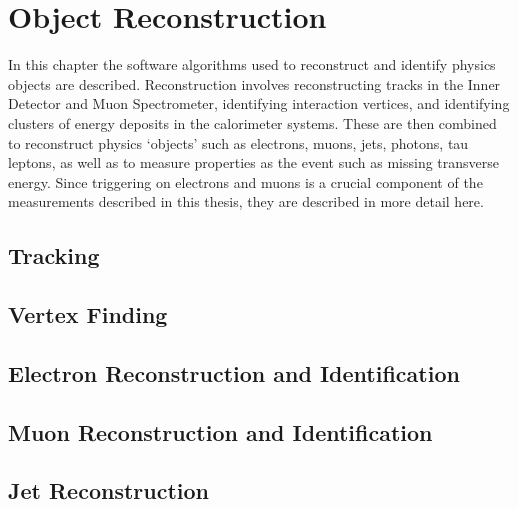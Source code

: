 \graphicspath{{Chapters/Reconstruction/Figures/}}
\label{chap:Reconstruction}
\chapter{Object Reconstruction}

In this chapter the software algorithms used to reconstruct and identify physics
objects are described. Reconstruction involves reconstructing tracks in the
Inner Detector and Muon Spectrometer, identifying interaction vertices,
and identifying clusters of energy deposits in the calorimeter systems. These are
then combined to reconstruct physics `objects' such as electrons, muons, jets, photons,
tau leptons, as well as to measure properties as the event such as missing
transverse energy. 
Since triggering on electrons and muons is a crucial component of the
measurements described in this thesis, they are described in more detail here.

\section{Tracking}
\label{sec:reco-tracking}


\section{Vertex Finding}
\label{sec:reco-vertexing}


\section{Electron Reconstruction and Identification}
\label{sec:reco-el}


\section{Muon Reconstruction and Identification}
\label{sec:reco-mu}


\section{Jet Reconstruction}
\label{sec:reco-jet}

